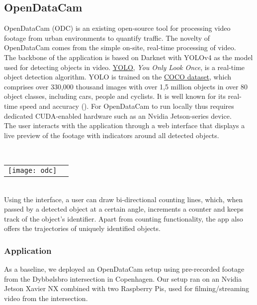 \subsection{OpenDataCam}
OpenDataCam (ODC) is an existing open-source tool for processing video footage from urban environments to quantify
traffic. The novelty of OpenDataCam comes from the simple on-site, real-time processing of video. 
\ \\

The backbone of the application is based on Darknet with YOLOv4 as the model used for detecting objects in video.
\href{https://pjreddie.com/darknet/yolo/}{YOLO}, \textit{You Only Look Once}, is a real-time object detection algorithm. 
YOLO is trained on the \href{https://cocodataset.org}{COCO dataset}, which comprises over 330,000 thousand images
with over 1,5 million objects in over 80 object classes, including cars, people and cyclists. 
It is well known for its real-time speed and accuracy (\cite{redmon2016look}). 
For OpenDataCam to run locally thus requires dedicated CUDA-enabled hardware such as an Nvidia Jetson-series device. 
\ \\

The user interacts with the application through a web interface that displays a live preview of the footage with
indicators around all detected objects.

\ \\
\raggedbottom
\noindent
\begin{tabular}{@{}cc}
\texttt{[image: odc]} 
\end{tabular}
\ \\

Using the interface, a user can draw bi-directional counting lines, which, when passed by a detected object at a certain angle, 
increments a counter and keeps track of the object's identifier. Apart from counting functionality, the app also offers the trajectories of uniquely identified objects. 

\raggedbottom
\subsubsection{Application}
As a baseline, we deployed an OpenDataCam setup using pre-recorded footage from the Dybbølsbro intersection in Copenhagen.
Our setup ran on an Nvidia Jetson Xavier NX combined with two Raspberry Pis, used for filming/streaming video from the intersection.

